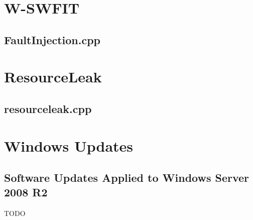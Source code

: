 
\chapter{W-SWFIT}
\section{FaultInjection.cpp} \label{app:w-swfit}


\chapter{ResourceLeak}
\section{resourceleak.cpp} \label{app:resourceLeak}


\chapter{Windows Updates}
\section{Software Updates Applied to Windows Server 2008 R2} \label{app:updates}
TODO

